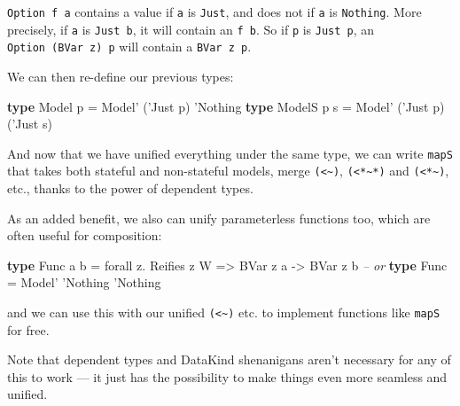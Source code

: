 \documentclass[]{article}
\newenvironment{Shaded}{}{}
\newcommand{\CharTok}[1]{\textcolor[rgb]{0.25,0.44,0.63}{#1}}
\newcommand{\CommentTok}[1]{\textcolor[rgb]{0.38,0.63,0.69}{\textit{#1}}}
\newcommand{\DataTypeTok}[1]{\textcolor[rgb]{0.56,0.13,0.00}{#1}}
\newcommand{\FunctionTok}[1]{\textcolor[rgb]{0.02,0.16,0.49}{#1}}
\newcommand{\KeywordTok}[1]{\textcolor[rgb]{0.00,0.44,0.13}{\textbf{#1}}}
\newcommand{\NormalTok}[1]{#1}
\newcommand{\OtherTok}[1]{\textcolor[rgb]{0.00,0.44,0.13}{#1}}
\begin{document}
\texttt{Option\ f\ a} contains a value if \texttt{a} is
\texttt{\textquotesingle{}Just}, and does not if \texttt{a} is
\texttt{\textquotesingle{}Nothing}. More precisely, if \texttt{a} is
\texttt{\textquotesingle{}Just\ b}, it will contain an \texttt{f\ b}. So if
\texttt{p} is \texttt{\textquotesingle{}Just\ p\textquotesingle{}}, an
\texttt{Option\ (BVar\ z)\ p} will contain a
\texttt{BVar\ z\ p\textquotesingle{}}.

We can then re-define our previous types:

\begin{Shaded}
\begin{Highlighting}[]
\KeywordTok{type} \DataTypeTok{Model}\NormalTok{  p   }\FunctionTok{=} \DataTypeTok{Model'}\NormalTok{ (}\CharTok{'Just p) '}\DataTypeTok{Nothing}
\KeywordTok{type} \DataTypeTok{ModelS}\NormalTok{ p s }\FunctionTok{=} \DataTypeTok{Model'}\NormalTok{ (}\CharTok{'Just p) ('}\DataTypeTok{Just}\NormalTok{ s)}
\end{Highlighting}
\end{Shaded}

And now that we have unified everything under the same type, we can write
\texttt{mapS} that takes both stateful and non-stateful models, merge
\texttt{(\textless{}\textasciitilde{})},
\texttt{(\textless{}*\textasciitilde{}*)} and
\texttt{(\textless{}*\textasciitilde{})}, etc., thanks to the power of dependent
types.

As an added benefit, we also can unify parameterless functions too, which are
often useful for composition:

\begin{Shaded}
\begin{Highlighting}[]
\KeywordTok{type} \DataTypeTok{Func}\NormalTok{ a b }\FunctionTok{=}\NormalTok{ forall z}\FunctionTok{.} \DataTypeTok{Reifies}\NormalTok{ z }\DataTypeTok{W} \OtherTok{=>} \DataTypeTok{BVar}\NormalTok{ z a }\OtherTok{->} \DataTypeTok{BVar}\NormalTok{ z b}
\CommentTok{-- or}
\KeywordTok{type} \DataTypeTok{Func}     \FunctionTok{=} \DataTypeTok{Model'} \CharTok{'Nothing '}\DataTypeTok{Nothing}
\end{Highlighting}
\end{Shaded}

and we can use this with our unified \texttt{(\textless{}\textasciitilde{})}
etc. to implement functions like \texttt{mapS} for free.

Note that dependent types and DataKind shenanigans aren't necessary for any of
this to work --- it just has the possibility to make things even more seamless
and unified.
\end{document}
